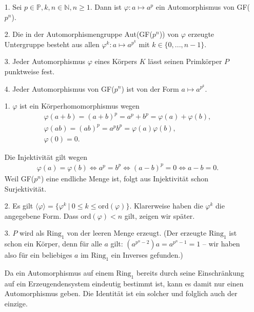 \begin{solution}
  \begin{itemize}
      \item[1.] Sei $p \in \mathbb{P}, k, n \in \mathbb{N}, n \geq 1.$ Dann ist $\varphi: a \mapsto a^p$ ein Automorphismus von GF($p^n$).
      \item[2.] Die in der Automorphismengruppe Aut(GF($p^n$)) von $\varphi$ erzeugte Untergruppe besteht aus allen $\varphi^k: a \mapsto a^{p^k}$ mit $k \in \{0, ..., n-1\}.$
      \item[3.] Jeder Automorphismus $\varphi$ eines Körpers $K$ lässt seinen Primkörper $P$ punktweise fest.
      \item[4.] Jeder Automorphismus von GF($p^n$) ist von der Form $a \mapsto a^{p^k}.$
  \end{itemize}

    \begin{itemize}
        \item[1.] $\varphi$ ist ein Körperhomomorphismus wegen
        \begin{align}
            \varphi(a + b) = (a + b)^p = a^p + b^p = \varphi(a) + \varphi(b), \\
            \varphi(ab) = (ab)^p = a^p b^p = \varphi(a) \varphi(b), \\
            \varphi(0) = 0.
        \end{align}

    Die Injektivität gilt wegen
    \begin{align}
        \varphi(a) = \varphi(b) \Longleftrightarrow a^p = b^p \Longleftrightarrow (a-b)^p = 0 \Longleftrightarrow a - b = 0.
    \end{align}
    Weil GF($p^n$) eine endliche Menge ist, folgt aus Injektivität schon Surjektivität.

    \item[2.] Es gilt $\langle\varphi\rangle = \{\varphi^k~|~ 0 \leq k \leq \mathrm{ord}(\varphi)\}.$ Klarerweise haben die $\varphi^k$ die angegebene Form. Dass $\mathrm{ord}(\varphi) < n$ gilt, zeigen wir später.

    \item[3.] $P$ wird als $\mathrm{Ring}_1$ von der leeren Menge erzeugt. (Der erzeugte $\mathrm{Ring}_1$ ist schon ein Körper, denn für alle $a$ gilt: $(a^{p^n-2}) a = a^{p^n-1} = 1$ -- wir haben also für ein beliebiges $a$ im $\mathrm{Ring}_1$ ein Inverses gefunden.)

    Da ein Automorphismus auf einem $\mathrm{Ring}_1$ bereits durch seine Einschränkung auf ein Erzeugendensystem eindeutig bestimmt ist, kann es damit nur einen Automorphismus geben. Die Identität ist ein solcher und folglich auch der einzige.


\end{itemize}
\end{solution}
